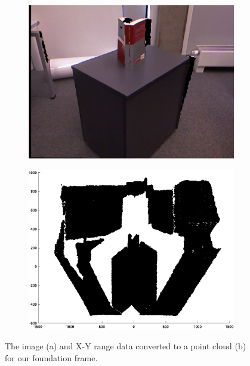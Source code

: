 \begin{figure}[H]
	\centering
	\begin{subfigure}[b]{0.45\textwidth}
		\centering
		\includegraphics[width=\textwidth]{Images/1-Image(1).png}
		\caption{}
	\end{subfigure}%
	\hspace{1cm}
	\begin{subfigure}[b]{0.45\textwidth}
		\centering
		\includegraphics[width=\textwidth]{Images/2-Range(1).png}
		\caption{}
	\end{subfigure}
	\caption{The image (a) and X-Y range data converted to a point cloud (b) for our foundation frame.}
	\label{fig:foundation}
\end{figure}